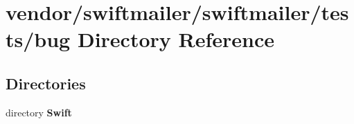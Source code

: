 \section{vendor/swiftmailer/swiftmailer/tests/bug Directory Reference}
\label{dir_c9e458965e3b0698fe4dbee08be36d11}
\subsection*{Directories}
\begin{DoxyCompactItemize}
\item 
directory {\bf Swift}
\end{DoxyCompactItemize}
